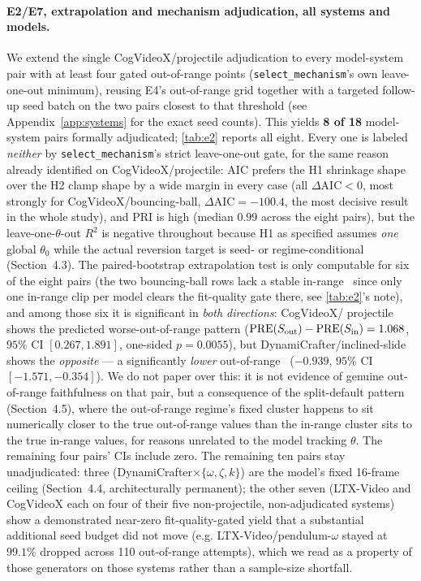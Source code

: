 \paragraph{E2/E7, extrapolation and mechanism adjudication, all systems and
models.}
We extend the single CogVideoX/projectile adjudication to every model-system
pair with at least four gated out-of-range points (\texttt{select\_mechanism}'s
own leave-one-out minimum), reusing E4's out-of-range grid together with a
targeted follow-up seed batch on the two pairs closest to that threshold
(see Appendix~\ref{app:systems} for the exact seed counts). This yields
\textbf{8 of 18} model-system pairs formally adjudicated; \autoref{tab:e2}
reports all eight. Every one is labeled \emph{neither} by
\texttt{select\_mechanism}'s strict leave-one-out gate, for the same reason
already identified on CogVideoX/projectile: AIC prefers the H1 shrinkage
shape over the H2 clamp shape by a wide margin in every case (all
$\Delta\mathrm{AIC}<0$, most strongly for CogVideoX/bouncing-ball,
$\Delta\mathrm{AIC}=-100.4$, the most decisive result in the whole study),
and PRI is high (median $0.99$ across the eight pairs), but the
leave-one-$\theta$-out $R^2$ is negative throughout because H1 as specified
assumes \emph{one} global $\theta_0$ while the actual reversion target is
seed- or regime-conditional (Section~4.3). The paired-bootstrap
extrapolation test is only computable for six of the eight pairs (the two
bouncing-ball rows lack a stable in-range \PRE\ since only one in-range clip
per model clears the fit-quality gate there, see \autoref{tab:e2}'s note),
and among those six it is significant in \emph{both directions}: CogVideoX/
projectile shows the predicted worse-out-of-range pattern
($\mathrm{PRE}(S_\text{out})-\mathrm{PRE}(S_\text{in})=1.068$, $95\%$ CI $[0.267,1.891]$,
one-sided $p=0.0055$), but DynamiCrafter/inclined-slide shows the
\emph{opposite} --- a significantly \emph{lower} out-of-range \PRE\
($-0.939$, $95\%$ CI $[-1.571,-0.354]$). We do not paper over this: it is
not evidence of genuine out-of-range faithfulness on that pair, but a
consequence of the split-default pattern (Section~4.5), where the
out-of-range regime's fixed cluster happens to sit numerically closer to
the true out-of-range values than the in-range cluster sits to the true
in-range values, for reasons unrelated to the model tracking $\theta$. The
remaining four pairs' CIs include zero. The remaining
ten pairs stay unadjudicated: three (DynamiCrafter$\times\{\omega,\zeta,
k\}$) are the model's fixed 16-frame ceiling (Section~4.4, architecturally
permanent); the other seven (LTX-Video and CogVideoX each on four of their
five non-projectile, non-adjudicated systems) show a demonstrated
near-zero fit-quality-gated yield that a substantial additional seed budget
did not move (e.g. LTX-Video/pendulum-$\omega$ stayed at $99.1\%$ dropped
across 110 out-of-range attempts), which we read as a property of those
generators on those systems rather than a sample-size shortfall.


